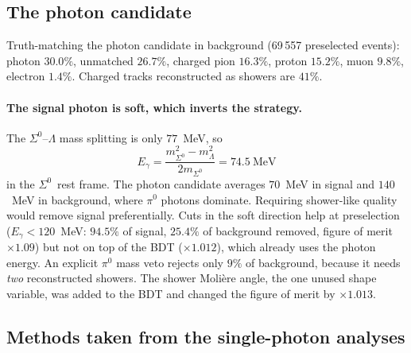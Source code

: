 \documentclass[11pt,a4paper]{article}
\newcommand{\Szero}{\ensuremath{\Sigma^{0}}}
\newcommand{\Lam}{\ensuremath{\Lambda}}
\begin{document}
\subsection{The photon candidate}
\label{sec:photonstudy}

Truth-matching the photon candidate in background (69\,557 preselected events):
photon $30.0\%$, unmatched $26.7\%$, charged pion $16.3\%$, proton $15.2\%$, muon
$9.8\%$, electron $1.4\%$. Charged tracks reconstructed as showers are $41\%$.

\paragraph{The signal photon is soft, which inverts the strategy.} The
$\Szero$--$\Lam$ mass splitting is only $77$~MeV, so
\begin{equation}
  E_\gamma = \frac{m_{\Szero}^2 - m_{\Lam}^2}{2 m_{\Szero}} = 74.5~\mathrm{MeV}
\end{equation}
in the \Szero\ rest frame. The photon candidate averages $70$~MeV in signal and
$140$~MeV in background, where $\pi^0$ photons dominate. Requiring shower-like quality
would remove signal preferentially. Cuts in the soft direction help at preselection
($E_\gamma<120$~MeV: $94.5\%$ of signal, $25.4\%$ of background removed, figure of
merit $\times1.09$) but not on top of the BDT ($\times1.012$), which already uses the
photon energy. An explicit $\pi^0$ mass veto rejects only $9\%$ of background, because
it needs \emph{two} reconstructed showers. The shower Moli\`ere angle, the one unused
shape variable, was added to the BDT and changed the figure of merit by $\times1.013$.

\subsection{Methods taken from the single-photon analyses}
\label{sec:glee}
\end{document}
